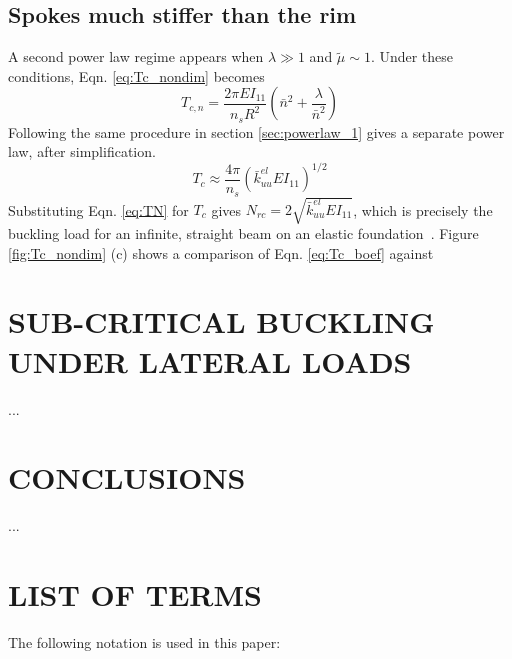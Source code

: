 \documentclass{bmd2016p}
\begin{document}
\subsection{Spokes much stiffer than the rim}
A second power law regime appears when $\lambda \gg 1$ and $\tilde{\mu} \sim 1$. Under these conditions, Eqn. \ref{eq:Tc_nondim} becomes
	\begin{equation}\label{eq:Tcn_boef}
	T_{c,n} = \frac{2\pi EI_{11}}{n_sR^2}\left(\bar{n}^2 + \frac{\lambda}{\bar{n}^2} \right)
	\end{equation}
Following the same procedure in section \ref{sec:powerlaw_1} gives a separate power law, after simplification.
	\begin{equation}\label{eq:Tc_boef}
	T_c \approx \frac{4\pi}{n_s} \left(\bar{k}_{uu}^{el}EI_{11} \right)^{1/2} 
	\end{equation}
Substituting Eqn. \ref{eq:TN} for $T_c$ gives $N_{rc}=2\sqrt{\bar{k}_{uu}^{el}EI_{11}}$, which is precisely the buckling load for an infinite, straight beam on an elastic foundation~\cite{Hetenyi1946a}. Figure \ref{fig:Tc_nondim} (c) shows a comparison of Eqn. \ref{eq:Tc_boef} against 



\section{SUB-CRITICAL BUCKLING UNDER LATERAL LOADS}
...



\section{CONCLUSIONS}
...






\section*{LIST OF TERMS}
The following notation is used in this paper:
\end{document}
